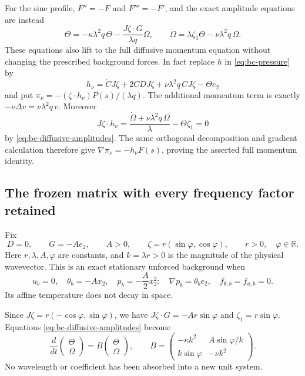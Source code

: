 For the sine profile, $F''=-F$ and $F'''=-F'$, and the exact amplitude
equations are instead
\begin{equation}
\dot\Theta=-\kappa\lambda^2q\,\Theta
-\frac{J\zeta\cdot G}{\lambda q}\Omega,\qquad
\dot\Omega=\lambda\zeta_1\Theta-\nu\lambda^2q\,\Omega.
\label{eq:bc-diffusive-amplitudes}
\end{equation}
These equations also lift to the full diffusive momentum equation
without changing the prescribed background forces. In fact replace
$h$ in \eqref{eq:bc-pressure} by
\[
h_\nu=\dot C J\zeta+2CDJ\zeta+\nu\lambda^2q\,C J\zeta-\Theta e_2
\]
and put
$\pi_\nu=-(\zeta\cdot h_\nu)P(s)/(\lambda q)$.
The additional momentum term is exactly
$-\nu\Delta v=\nu\lambda^2q\,v$.
Moreover
\[
J\zeta\cdot h_\nu
=\frac{\dot\Omega+\nu\lambda^2q\,\Omega}{\lambda}
-\Theta\zeta_1=0
\]
by \eqref{eq:bc-diffusive-amplitudes}. The same orthogonal decomposition
and gradient calculation therefore give
$\nabla\pi_\nu=-h_\nu F(s)$, proving the asserted full momentum identity.

\subsection{The frozen matrix with every frequency factor retained}

Fix
\[
D=0,\qquad G=-Ae_2,\qquad A>0,\qquad
\zeta=r(\sin\varphi,\cos\varphi),\qquad r>0,\quad\varphi\in\mathbb R.
\]
Here $r,\lambda,A,\varphi$ are constants, and $k=\lambda r>0$
is the magnitude of the physical wavevector.
This is an exact stationary unforced background when
\[
u_b=0,\quad\theta_b=-Ax_2,\quad p_b=-\frac A2x_2^2:
\quad \nabla p_b=\theta_be_2,\quad f_{\theta,b}=f_{u,b}=0.
\]
Its affine temperature does not decay in space.

Since $J\zeta=r(-\cos\varphi,\sin\varphi)$, we have
$J\zeta\cdot G=-Ar\sin\varphi$ and $\zeta_1=r\sin\varphi$.
Equations \eqref{eq:bc-diffusive-amplitudes} become
\begin{equation}
\frac{d}{dt}\begin{pmatrix}\Theta\\\Omega\end{pmatrix}
=
B\begin{pmatrix}\Theta\\\Omega\end{pmatrix},\qquad
B=\begin{pmatrix}
-\kappa k^2&A\sin\varphi/k\\
k\sin\varphi&-\nu k^2
\end{pmatrix}.
\label{eq:bc-frozen-matrix}
\end{equation}
No wavelength or coefficient has been absorbed into a new unit system.

